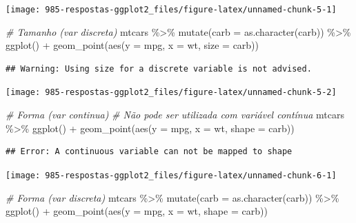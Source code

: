 \documentclass[
]{book}
\newenvironment{Shaded}{\begin{snugshade}}{\end{snugshade}}
\newcommand{\AttributeTok}[1]{\textcolor[rgb]{0.77,0.63,0.00}{#1}}
\newcommand{\CommentTok}[1]{\textcolor[rgb]{0.56,0.35,0.01}{\textit{#1}}}
\newcommand{\FunctionTok}[1]{\textcolor[rgb]{0.00,0.00,0.00}{#1}}
\newcommand{\NormalTok}[1]{#1}
\newcommand{\SpecialCharTok}[1]{\textcolor[rgb]{0.00,0.00,0.00}{#1}}
\begin{document}
\begin{center}\texttt{[image: 985-respostas-ggplot2\_files/figure-latex/unnamed-chunk-5-1]} \end{center}

\begin{Shaded}
\begin{Highlighting}[]
\CommentTok{\# Tamanho (var discreta)}
\NormalTok{mtcars }\SpecialCharTok{\%\textgreater{}\%} 
  \FunctionTok{mutate}\NormalTok{(}\AttributeTok{carb =} \FunctionTok{as.character}\NormalTok{(carb)) }\SpecialCharTok{\%\textgreater{}\%} 
  \FunctionTok{ggplot}\NormalTok{() }\SpecialCharTok{+}
  \FunctionTok{geom\_point}\NormalTok{(}\FunctionTok{aes}\NormalTok{(}\AttributeTok{y =}\NormalTok{ mpg, }\AttributeTok{x =}\NormalTok{ wt, }\AttributeTok{size =}\NormalTok{ carb))}
\end{Highlighting}
\end{Shaded}

\begin{verbatim}
## Warning: Using size for a discrete variable is not advised.
\end{verbatim}

\begin{center}\texttt{[image: 985-respostas-ggplot2\_files/figure-latex/unnamed-chunk-5-2]} \end{center}

\begin{Shaded}
\begin{Highlighting}[]
\CommentTok{\# Forma (var continua)}
\CommentTok{\# Não pode ser utilizada com variável contínua}
\NormalTok{mtcars }\SpecialCharTok{\%\textgreater{}\%} 
  \FunctionTok{ggplot}\NormalTok{() }\SpecialCharTok{+}
  \FunctionTok{geom\_point}\NormalTok{(}\FunctionTok{aes}\NormalTok{(}\AttributeTok{y =}\NormalTok{ mpg, }\AttributeTok{x =}\NormalTok{ wt, }\AttributeTok{shape =}\NormalTok{ carb))}
\end{Highlighting}
\end{Shaded}

\begin{verbatim}
## Error: A continuous variable can not be mapped to shape
\end{verbatim}

\begin{center}\texttt{[image: 985-respostas-ggplot2\_files/figure-latex/unnamed-chunk-6-1]} \end{center}

\begin{Shaded}
\begin{Highlighting}[]
\CommentTok{\# Forma (var discreta)}
\NormalTok{mtcars }\SpecialCharTok{\%\textgreater{}\%} 
  \FunctionTok{mutate}\NormalTok{(}\AttributeTok{carb =} \FunctionTok{as.character}\NormalTok{(carb)) }\SpecialCharTok{\%\textgreater{}\%}
  \FunctionTok{ggplot}\NormalTok{() }\SpecialCharTok{+}
  \FunctionTok{geom\_point}\NormalTok{(}\FunctionTok{aes}\NormalTok{(}\AttributeTok{y =}\NormalTok{ mpg, }\AttributeTok{x =}\NormalTok{ wt, }\AttributeTok{shape =}\NormalTok{ carb))}
\end{Highlighting}
\end{Shaded}
\end{document}
